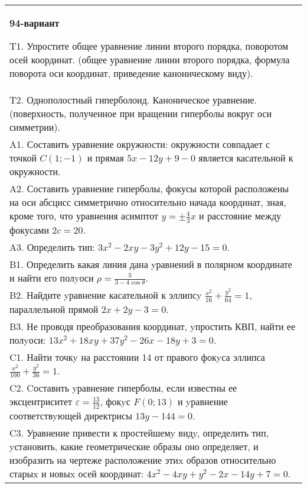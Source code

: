 \documentclass{article}
\begin{document}
\begin{tabular}{m{17cm}}
\textbf{94-вариант}
\newline

T1. Упростите общее уравнение линии второго порядка, поворотом осей координат. (общее уравнение линии второго порядка, формула поворота оси координат, приведение каноническому виду).\\

T2. Однополостный гиперболоид. Каноническое уравнение. (поверхность, полученное при вращении гиперболы вокруг оси симметрии).\\

A1. Составить уравнение окружности: окружности совпадает с точкой $C(1;-1)$ и прямая $5x-12y+9-0$ является касательной к окружности.\\

A2. Составить уравнение гиперболы, фокусы которой расположены на оси абсцисс симметрично относительно начада координат, зная, кроме того, что уравнения асимптот $y=\pm \frac{4}{3}x$ и расстояние между фокусами $2c=20$.\\

A3. Определить тип: $3x^{2}-2xy-3y^{2}+12y-15=0$.\\

B1. Определить какая линия дана yравнений в полярном координате и найти его полyоси $\rho = \frac{5}{3 - 4\cos\theta}$.  \\

B2. Найдите yравнение касательной к эллипсy $\frac{x^{2}}{16} + \frac{y^{2}}{64} = 1$, параллельной прямой $2x + 2y - 3 = 0$.  \\

B3. Не проводя преобразования координат, yпростить КВП, найти ее полyоси: $13x^{2} + 18xy + 37y^{2} - 26x - 18y + 3 = 0$.  \\

C1. Найти точкy на расстоянии 14 от правого фокyса эллипса $\frac{x^{2}}{100}+\frac{y^{2}}{36}=1$.\\

C2. Cоставить yравнение гиперболы, если известны ее эксцентриситет $\varepsilon=\frac{13}{12}$, фокyс $F(0;13)$ и yравнение соответствyющей директрисы $13y-144=0$.  \\

C3. Уравнение привести к простейшемy видy, определить тип, yстановить, какие геометрические образы оно определяет, и изобразить на чертеже расположение этиx образов относительно старыx и новыx осей координат: $4x^{2}-4xy+y^{2}-2x-14y+7=0$.  \\

\end{tabular}
\vspace{1cm}
\end{document}
